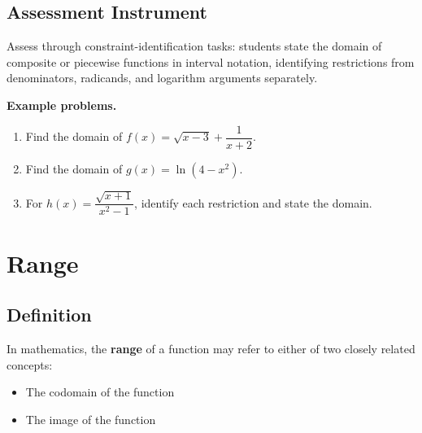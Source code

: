 \subsection{Assessment Instrument}
\label{ssec:asse-3669}


Assess through constraint-identification tasks: students state the domain
of composite or piecewise functions in interval notation, identifying
restrictions from denominators, radicands, and logarithm arguments
separately.

\textbf{Example problems.}
\begin{enumerate}
    \item Find the domain of $f(x)=\sqrt{x-3}+\dfrac{1}{x+2}$.
    \item Find the domain of $g(x)=\ln(4-x^2)$.
    \item For $h(x)=\dfrac{\sqrt{x+1}}{x^2-1}$, identify each restriction
          and state the domain.
\end{enumerate}



\section{Range}
\label{sec:rang-37b1}



\subsection{Definition}
\label{sss:defi-3061}




In mathematics, the \textbf{range} of a function may refer to either of two closely
related concepts:



\begin{itemize}
    \item The codomain of the function
    \item The image of the function
\end{itemize}

